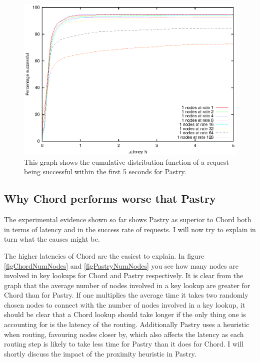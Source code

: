 \begin{figure}[!htb]
  \begin{center}
    \includegraphics[width=0.9\linewidth]{illustrations/cdf_pastry.eps}
    \caption{This graph shows the cumulative distribution function of a request being successful within the first 5 seconds for Pastry.}
    \label{figPastryCDF}
  \end{center}
\end{figure}

\subsection{Why Chord performs worse that Pastry}
The experimental evidence shown so far shows Pastry as superior to Chord both in terms of latency and in the success rate of requests. I will now try to explain in turn what the causes might be.

\mbox{}

The higher latencies of Chord are the easiest to explain. In figure \ref{figChordNumNodes} and \ref{figPastryNumNodes} you see how many nodes are involved in key lookups for Chord and Pastry respectively. It is clear from the graph that the average number of nodes involved in a key lookup are greater for Chord than for Pastry. If one multiplies the average time it takes two randomly chosen nodes to connect with the number of nodes involved in a key lookup, it should be clear that a Chord lookup should take longer if the only thing one is accounting for is the latency of the routing. Additionally Pastry uses a heuristic when routing, favouring nodes closer by, which also affects the latency as each routing step is likely to take less time for Pastry than it does for Chord. I will shortly discuss the impact of the proximity heuristic in Pastry.

